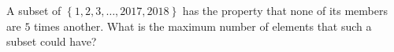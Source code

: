A subset of $\left\{1,2,3,\ldots,2017,2018\right\}$ has the property that none of its members are $5$ times another. What is the maximum number of elements that such a subset could have?